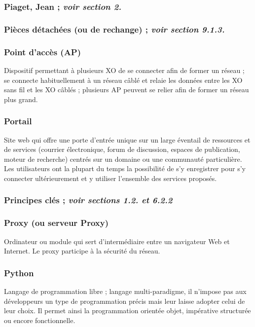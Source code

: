 \documentclass[12pt]{article}
\begin{document}
\subsubsection{Piaget, Jean ; \emph{voir section 2.}}
\label{sec-14-13-3}
\subsubsection{Pièces détachées (ou de rechange) ; \emph{voir section 9.1.3.}}
\label{sec-14-13-4}
\subsubsection{Point d'accès (AP)}
\label{sec-14-13-5}


Dispositif permettant à plusieurs XO de se connecter afin de former un
réseau ; se connecte habituellement à un réseau câblé et relaie les données
entre les XO sans fil et les XO câblés ; plusieurs AP peuvent se relier
afin de former un réseau plus grand.
\subsubsection{Portail}
\label{sec-14-13-6}


Site web qui offre une porte d'entrée unique sur un large éventail de
ressources et de services (courrier électronique, forum de discussion,
espaces de publication, moteur de recherche) centrés sur un domaine ou une
communauté particulière. Les utilisateurs ont la plupart du temps la
possibilité de s'y enregistrer pour s'y connecter ultérieurement et y
utiliser l'ensemble des services proposés.
\subsubsection{Principes clés ; \emph{voir sections 1.2. et 6.2.2}}
\label{sec-14-13-7}
\subsubsection{Proxy (ou serveur Proxy)}
\label{sec-14-13-8}


Ordinateur ou module qui sert d'intermédiaire entre un navigateur Web et
Internet. Le proxy participe à la sécurité du réseau.
\subsubsection{Python}
\label{sec-14-13-9}


Langage de programmation libre ; langage multi-paradigme, il n'impose pas
aux développeurs un type de programmation précis mais leur laisse adopter
celui de leur choix. Il permet ainsi la programmation orientée objet,
impérative structurée ou encore fonctionnelle.
\end{document}
